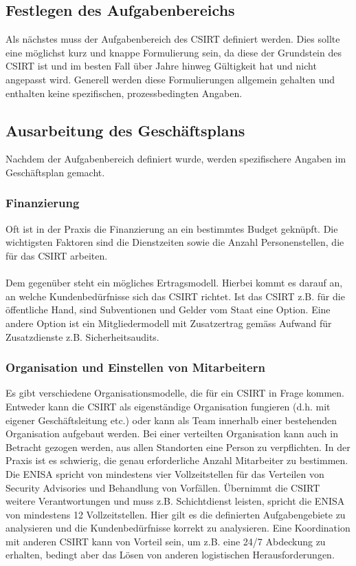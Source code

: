 \subsection{Festlegen des Aufgabenbereichs}
Als nächstes muss der Aufgabenbereich des CSIRT definiert werden. Dies sollte eine möglichst kurz und knappe Formulierung sein, da diese der Grundstein des CSIRT ist und im besten Fall über Jahre hinweg Gültigkeit hat und nicht angepasst wird. Generell werden diese Formulierungen allgemein gehalten und enthalten keine spezifischen, prozessbedingten Angaben.

\subsection{Ausarbeitung des Geschäftsplans}
Nachdem der Aufgabenbereich definiert wurde, werden spezifischere Angaben im Geschäftsplan gemacht. 

\subsubsection{Finanzierung}
Oft ist in der Praxis die Finanzierung an ein bestimmtes Budget geknüpft. Die wichtigsten Faktoren sind die Dienstzeiten sowie die Anzahl Personenstellen, die für das CSIRT arbeiten.\\
\\
Dem gegenüber steht ein mögliches Ertragsmodell. Hierbei kommt es darauf an, an welche Kundenbedürfnisse sich das CSIRT richtet. Ist das CSIRT z.B. für die öffentliche Hand, sind Subventionen und Gelder vom Staat eine Option. Eine andere Option ist ein Mitgliedermodell mit Zusatzertrag gemäss Aufwand für Zusatzdienste z.B. Sicherheitsaudits.

\subsubsection{Organisation und Einstellen von Mitarbeitern}
Es gibt verschiedene Organisationsmodelle, die für ein CSIRT in Frage kommen. Entweder kann die CSIRT als eigenständige Organisation fungieren (d.h. mit eigener Geschäftsleitung etc.) oder kann als Team innerhalb einer bestehenden Organisation aufgebaut werden. Bei einer verteilten Organisation kann auch in Betracht gezogen werden, aus allen Standorten eine Person zu verpflichten. In der Praxis ist es schwierig, die genau erforderliche Anzahl Mitarbeiter zu bestimmen. Die ENISA spricht von mindestens vier Vollzeitstellen für das Verteilen von Security Advisories und Behandlung von Vorfällen. Übernimmt die CSIRT weitere Verantwortungen und muss z.B. Schichtdienst leisten, spricht die ENISA von mindestens 12 Vollzeitstellen. Hier gilt es die definierten Aufgabengebiete zu analysieren und die Kundenbedürfnisse korrekt zu analysieren. Eine Koordination mit anderen CSIRT kann von Vorteil sein, um z.B. eine 24/7 Abdeckung zu erhalten, bedingt aber das Lösen von anderen logistischen Herausforderungen.

